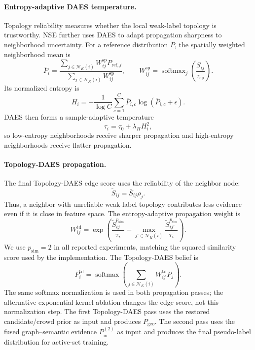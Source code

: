 \paragraph{Entropy-adaptive DAES temperature.}
Topology reliability measures whether the local weak-label topology is
trustworthy. NSE further uses DAES to adapt propagation sharpness to
neighborhood uncertainty. For a reference distribution $P$, the spatially
weighted neighborhood mean is
\begin{equation}
    \bar{P}_i =
    \frac{\sum_{j\in\mathcal{N}_K(i)}
    W^{\mathrm{sp}}_{ij}P_{\mathrm{ref},j}}
    {\sum_{j\in\mathcal{N}_K(i)}W^{\mathrm{sp}}_{ij}},
    \qquad
    W^{\mathrm{sp}}_{ij}
    =
    \operatorname{softmax}_{j}
    \left(\frac{S_{ij}}{\tau_{\mathrm{sp}}}\right).
\end{equation}
Its normalized entropy is
\begin{equation}
    H_i =
    -\frac{1}{\log C}
    \sum_{c=1}^{C}\bar{P}_{i,c}\log(\bar{P}_{i,c}+\epsilon).
\end{equation}
DAES then forms a sample-adaptive temperature
\begin{equation}
    \tau_i = \tau_0 + \lambda_H H_i^2,
    \label{eq:daes_tau}
\end{equation}
so low-entropy neighborhoods receive sharper propagation and high-entropy
neighborhoods receive flatter propagation.

\paragraph{Topology-DAES propagation.}
The final Topology-DAES edge score uses the reliability of the neighbor node:
\begin{equation}
    \tilde{S}_{ij}=\bar{S}_{ij}\rho_j.
    \label{eq:neighbor_reliability_edge}
\end{equation}
Thus, a neighbor with unreliable weak-label topology contributes less evidence
even if it is close in feature space. The entropy-adaptive propagation weight is
\begin{equation}
    W^{\mathrm{td}}_{ij} =
    \exp\left(
    \frac{\tilde{S}_{ij}^{p_{\mathrm{sim}}}}{\tau_i}
    -
    \max_{j'\in\mathcal{N}_K(i)}
    \frac{\tilde{S}_{ij'}^{p_{\mathrm{sim}}}}{\tau_i}
    \right).
    \label{eq:daes_weight}
\end{equation}
We use $p_{\mathrm{sim}}=2$ in all reported experiments, matching the squared
similarity score used by the implementation.
The Topology-DAES belief is
\begin{equation}
    P^{\mathrm{td}}_i =
    \operatorname{softmax}\left(
    \sum_{j\in\mathcal{N}_K(i)} W^{\mathrm{td}}_{ij}P_j
    \right).
\end{equation}
The same softmax normalization is used in both propagation passes; the
alternative exponential-kernel ablation changes the edge score, not this
normalization step.
The first Topology-DAES pass uses the restored candidate/crowd prior as input and
produces $P_{\mathrm{geo}}$. The second pass uses the fused graph--semantic
evidence $P_{\mathrm{in}}^{(2)}$ as input and produces the final pseudo-label
distribution for active-set training.


